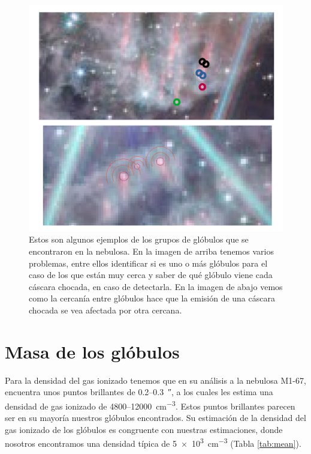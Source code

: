 \documentclass{book}
\begin{document}
\begin{figure}[htb]
    \centering
    \includegraphics[width=\textwidth]{imagenes_corregidas/n_gruops_globules.pdf}
    \caption{Estos son algunos ejemplos de los grupos de glóbulos que se encontraron en la nebulosa. En la imagen de arriba tenemos varios problemas, entre ellos identificar si es uno o más glóbulos para el caso de los que están muy cerca y saber de qué glóbulo viene cada cáscara chocada, en caso de detectarla. En la imagen de abajo vemos como la cercanía entre glóbulos hace que la emisión de una cáscara chocada se vea afectada por otra cercana.}
    \label{globule_group}
\end{figure}

\section{Masa de los glóbulos}\label{app:masa_glo}

Para la densidad del gas ionizado tenemos que \cite{Grosdidier:1998} en su análisis a la nebulosa M1-67, encuentra unos puntos brillantes de 0.2--\SI{0.3}{\arcsecond}, a los cuales les estima una densidad de gas ionizado de 4800--\SI{12 000}{cm^{-3}}. Estos puntos brillantes parecen ser en su mayoría nuestros glóbulos encontrados. Su estimación de la densidad del gas ionizado de los glóbulos es congruente con nuestras estimaciones, donde nosotros encontramos una densidad típica de \SI{5e3}{cm^{-3}} (Tabla \ref{tab:mean}).  
\end{document}
